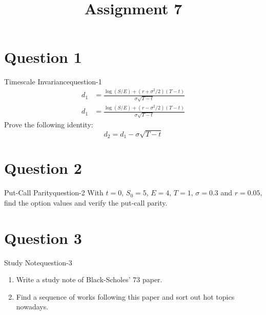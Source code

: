 \title{Assignment 7}


\section{Question 1}
\begin{statebox}{Timescale Invariance}{question-1}
    \begin{align*}
        d_1 &= \frac{\log(S/E)+(r+\sigma^2/2)(T-t)}{\sigma\sqrt{T-t}} \\
        d_1 &= \frac{\log(S/E)+(r-\sigma^2/2)(T-t)}{\sigma\sqrt{T-t}}
    \end{align*}
    Prove the following identity:
    \[
    	d_2 = d_1 - \sigma\sqrt{T-t}
    \]
\end{statebox}




\section{Question 2}
\begin{statebox}{Put-Call Parity}{question-2}
    With $t=0$, $S_0=5$, $E=4$, $T=1$, $\sigma=0.3$ and $r=0.05$, find the option values and verify the put-call parity.
\end{statebox}




\section{Question 3}
\begin{statebox}{Study Note}{question-3}
    \begin{enumerate}
    	\item Write a study note of Black-Scholes' 73 paper.
    	\item Find a sequence of works following this paper and sort out hot topics nowadays.
    \end{enumerate}
\end{statebox}

